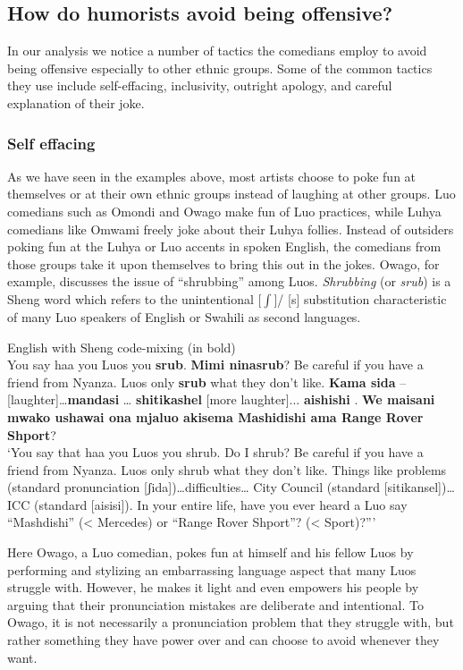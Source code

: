 \documentclass[output=paper]{langsci/langscibook}
\begin{document}
\subsection{How do humorists avoid being offensive? }

In our analysis we notice a number of tactics the comedians employ to avoid being offensive especially to other ethnic groups. Some of the common tactics they use include self-effacing, inclusivity, outright apology, and careful explanation of their joke.

\subsubsection{Self effacing}

As we have seen in the examples above, most artists choose to poke fun at themselves or at their own ethnic groups instead of laughing at other groups. Luo comedians such as Omondi and Owago make fun of Luo practices, while Luhya comedians like Omwami freely joke about their Luhya follies. Instead of outsiders poking fun at the Luhya or Luo accents in spoken English, the comedians from those groups take it upon themselves to bring this out in the jokes. Owago, for example, discusses the issue of “shrubbing” among Luos. \textit{Shrubbing} (or \textit{srub}) is a Sheng word which refers to the unintentional [${\int}$]/ [s] substitution characteristic of many Luo speakers of English or Swahili as second languages.

\ea
{English with Sheng code-mixing (in bold)}\\
 You say haa you Luos you \textbf{srub}. \textbf{Mimi ninasrub}? Be careful if you have a friend from Nyanza. Luos only \textbf{srub} what they don’t like. \textbf{Kama sida} –\textup{[laughter]}…\textbf{mandasi} … \textbf{shitikashel} \textup{[more laughter]}... \textbf{aishishi} . \textbf{We maisani mwako ushawai ona mjaluo akisema Mashidishi ama Range Rover Shport}?\\
‘You say that haa you Luos you shrub. Do I shrub? Be careful if you have a friend from Nyanza. Luos only shrub what they don’t like. Things like problems (standard pronunciation [ʃida])…difficulties… City Council (standard [sitikansel])… ICC (standard [aisisi]). In your entire life, have you ever heard a Luo say “Mashdishi” (< Mercedes) or “Range Rover Shport”? (< Sport)?”’ \citep{Churchill2013}
\z

Here Owago, a Luo comedian, pokes fun at himself and his fellow Luos by performing and stylizing an embarrassing language aspect that many Luos struggle with. However, he makes it light and even empowers his people by arguing that their pronunciation mistakes are deliberate and intentional. To Owago, it is not necessarily a pronunciation problem that they struggle with, but rather something they have power over and can choose to avoid whenever they want.
\end{document}
